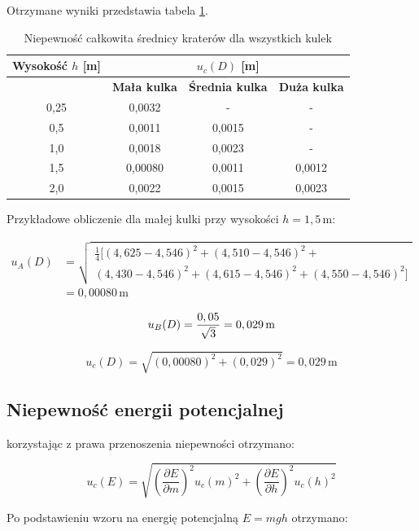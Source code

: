 \documentclass[a4paper,12pt]{article}
\begin{document}
Otrzymane wyniki przedstawia tabela \ref{tab:niepewnosc_calkowita_srednicy}.

\begin{table}[H]
\centering
\begin{tabular}{|c|c|c|c|}
\hline
\textbf{Wysokość $h$ [m]} & \multicolumn{3}{c|}{\textbf{$u_c(D)$ [m]}} \\
\hline
& \textbf{Mała kulka} & \textbf{Średnia kulka} & \textbf{Duża kulka} \\
\hline
0,25 & 0,0032 & - & - \\
\hline
0,5  & 0,0011 & 0,0015 & - \\
\hline
1,0  & 0,0018 & 0,0023 & - \\
\hline
1,5  & 0,00080 & 0,0011 & 0,0012 \\
\hline
2,0  & 0,0022 & 0,0015 & 0,0023 \\
\hline
\end{tabular}
\caption{Niepewność całkowita średnicy kraterów dla wszystkich kulek}
\label{tab:niepewnosc_calkowita_srednicy}
\end{table}

Przykładowe obliczenie dla małej kulki przy wysokości $h=1,5\,\text{m}$:

\begin{align*}
u_A(D) &= \sqrt{\begin{gathered}
    \frac{1}{4} [(4,625 - 4,546)^2 + (4,510 - 4,546)^2 + \\
    (4,430 - 4,546)^2 + (4,615 - 4,546)^2 + (4,550 - 4,546)^2]
\end{gathered}} \\
&= 0,00080\,\text{m}
\end{align*}

$$
u_B(D) = \frac{0,05}{\sqrt{3}} = 0,029\,\text{m} \\[1em]
$$

$$
u_c(D) = \sqrt{(0,00080)^2 + (0,029)^2} = 0,029\,\text{m}
$$




\subsection{Niepewność energii potencjalnej}

korzystając z prawa przenoszenia niepewności otrzymano:


$$
u_c(E) = \sqrt{\left(\frac{\partial E}{\partial m}\right)^2 u_c(m)^2 + \left(\frac{\partial E}{\partial h}\right)^2 u_c(h)^2}
$$

Po podstawieniu wzoru na energię potencjalną $E = mgh$ otrzymano:
\end{document}

